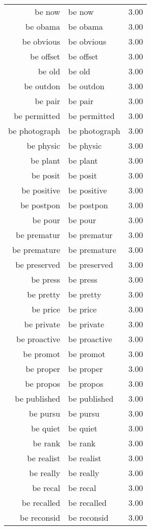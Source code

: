 \begin{table}[ht]
\begin{tabular}{rlr}
  be now & be now & 3.00 \\ 
  be obama & be obama & 3.00 \\ 
  be obvious & be obvious & 3.00 \\ 
  be offset & be offset & 3.00 \\ 
  be old & be old & 3.00 \\ 
  be outdon & be outdon & 3.00 \\ 
  be pair & be pair & 3.00 \\ 
  be permitted & be permitted & 3.00 \\ 
  be photograph & be photograph & 3.00 \\ 
  be physic & be physic & 3.00 \\ 
  be plant & be plant & 3.00 \\ 
  be posit & be posit & 3.00 \\ 
  be positive & be positive & 3.00 \\ 
  be postpon & be postpon & 3.00 \\ 
  be pour & be pour & 3.00 \\ 
  be prematur & be prematur & 3.00 \\ 
  be premature & be premature & 3.00 \\ 
  be preserved & be preserved & 3.00 \\ 
  be press & be press & 3.00 \\ 
  be pretty & be pretty & 3.00 \\ 
  be price & be price & 3.00 \\ 
  be private & be private & 3.00 \\ 
  be proactive & be proactive & 3.00 \\ 
  be promot & be promot & 3.00 \\ 
  be proper & be proper & 3.00 \\ 
  be propos & be propos & 3.00 \\ 
  be published & be published & 3.00 \\ 
  be pursu & be pursu & 3.00 \\ 
  be quiet & be quiet & 3.00 \\ 
  be rank & be rank & 3.00 \\ 
  be realist & be realist & 3.00 \\ 
  be really & be really & 3.00 \\ 
  be recal & be recal & 3.00 \\ 
  be recalled & be recalled & 3.00 \\ 
  be reconsid & be reconsid & 3.00 \\ 

\end{tabular}
\end{table}

